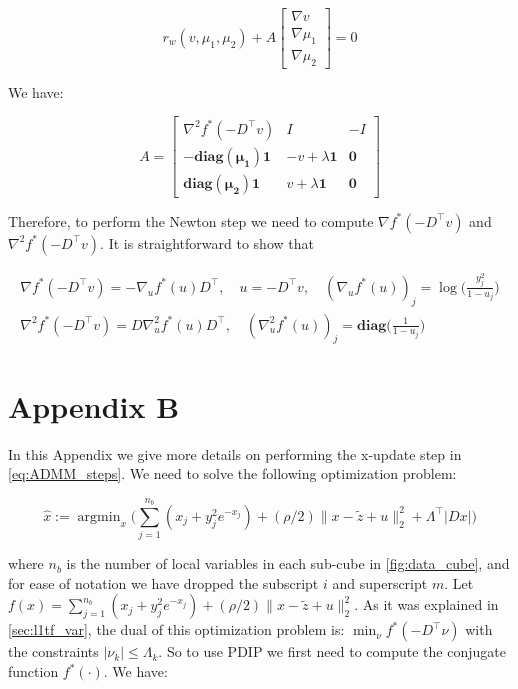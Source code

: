 \documentclass{article}
\DeclareMathOperator*{\argmin}{argmin}
\newcommand{\one}{\mathbf{1}}
\begin{document}
\begin{equation}
r_w(v,\mu_1,\mu_2)+A
\begin{bmatrix}
	\nabla v\\
	\nabla \mu_1\\
	\nabla \mu_2	
	\end{bmatrix}= 0
\label{eq:newton_step}
\end{equation}


We have:

\begin{equation}
A=
\begin{bmatrix}
	\nabla^2 f^*(-D^\top v) & I & -I\\
	-\mathbf{diag(\mu_1)}\one & -v+\lambda\one & \mathbf{0}\\
	\mathbf{diag(\mu_2)}\one & v+\lambda\one & \mathbf{0}
	\end{bmatrix}
\label{eq:delta_r}
\end{equation}

Therefore, to perform the Newton step we need to compute $\nabla f^*(-D^\top v)$ and $\nabla^2 f^*(-D^\top v)$. It is straightforward to show that

\begin{align}
\nabla f^*(-D^\top v) = -\nabla_u f^*(u) D^\top ,\quad u=-D^\top v, \quad (\nabla_u f^*(u))_j=\log\bigg(\frac{y_j^2}{1-u_j}\bigg) \\
\nabla^2 f^*(-D^\top v)=D\nabla_u^2 f^*(u)D^\top, \quad (\nabla_u^2 f^*(u))_j=\mathbf{diag}\bigg(\frac{1}{1-u_j}\bigg)
\end{align}


\section{Appendix B}
\label{sec:app_consADMM}

In this Appendix we give more details on performing the x-update step in \autoref{eq:ADMM_steps}. We need to solve the following optimization problem:

\begin{equation}
\hat{x}:=\argmin_{x} \bigg( \sum_{j=1}^{n_b} (x_j + y_j^2e^{-x_j}) + (\rho/2) \lVert x-\tilde{z} + u \lVert_2^2 + \Lambda^\top |D x| \bigg)
\label{eq:x_update_opt}
\end{equation}

\noindent where $n_b$ is the number of local variables in each sub-cube in \autoref{fig:data_cube}, and for ease of notation we have dropped the subscript $i$ and superscript $m$. Let $f(x)=\sum_{j=1}^{n_b} (x_j + y_j^2e^{-x_j}) + (\rho/2) \lVert x-\tilde{z} + u \lVert_2^2$. As it was explained in \autoref{sec:l1tf_var}, the dual of this optimization problem is: $\min_\nu f^*(-D^\top\nu)$ with the constraints $|\nu_k| \le \Lambda_k$. So to use PDIP we first need to compute the conjugate function $f^*(\cdot)$. We have:
\end{document}
